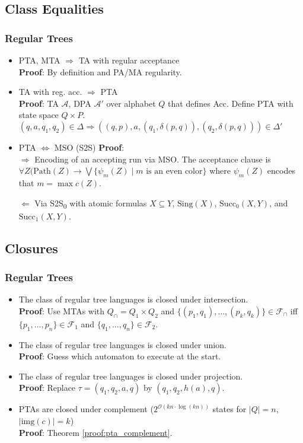 \documentclass{article}
\begin{document}
\subsection{Class Equalities}
\subsubsection{Regular Trees}
\begin{itemize}
	\item PTA, MTA $\Rightarrow$ TA with regular acceptance \\
		\textbf{Proof}: By definition and PA/MA regularity.
	\item TA with reg. acc. $\Rightarrow$ PTA \\
		\textbf{Proof}: TA $\mathcal{A}$, DPA $\mathcal{A}'$ over alphabet $Q$ that defines Acc. Define PTA with state space $Q \times P$. \\
		$(q, a, q_1, q_2) \in \Delta \Rightarrow ((q,p), a, (q_1, \delta(p, q)), (q_2, \delta(p, q))) \in \Delta'$
	\item PTA $\Leftrightarrow$ MSO (S2S)
		\textbf{Proof}: \\
		$\bm{\Rightarrow}$ Encoding of an accepting run via MSO. The acceptance clause is $\forall Z (\text{Path}(Z) \rightarrow \bigvee \{ \psi_m(Z) \mid m \text{ is an even color} \}$ where $\psi_m(Z)$ encodes that $m = \max c(Z)$.
		
		$\bm{\Leftarrow}$ Via S2S\textsubscript{0} with atomic formulas $X \subseteq Y$, $\text{Sing}(X)$, $\text{Succ}_0(X, Y)$, and $\text{Succ}_1(X, Y)$.
\end{itemize}

\subsection{Closures}
\subsubsection{Regular Trees}
\begin{itemize}
	\item The class of regular tree languages is closed under intersection. \\
		\textbf{Proof}: Use MTAs with $Q_\cap = Q_1 \times Q_2$ and $\{(p_1, q_1), \dots, (p_k, q_k)\} \in \mathcal{F}_\cap$ iff $\{p_1, \dots, p_n\} \in \mathcal{F}_1$ and $\{q_1, \dots, q_n\} \in \mathcal{F}_2$.
	\item The class of regular tree languages is closed under union. \\
		\textbf{Proof}: Guess which automaton to execute at the start.
	\item The class of regular tree languages is closed under projection. \\
		\textbf{Proof}: Replace $\tau = (q_1, q_2, a, q)$ by $(q_1, q_2, h(a), q)$.
	\item PTAs are closed under complement ($2^{\mathcal{O}(kn \cdot \log(kn))}$ states for $|Q| = n$, $|\text{img}(c)| = k$) \\
		\textbf{Proof}: Theorem \ref{proof:pta_complement}.
\end{itemize}
\end{document}
